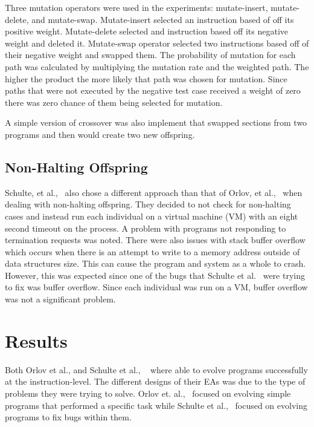 \documentclass{sig-alternate}
\begin{document}
Three mutation operators were used in the experiments: mutate-insert, mutate-delete, and mutate-swap. Mutate-insert selected an instruction based of off its positive weight. Mutate-delete selected and instruction based off its negative weight and deleted it. Mutate-swap operator selected two instructions based off of their negative weight and swapped them. The probability of mutation for each path was calculated by multiplying the mutation rate and the weighted path. The higher the product the more likely that path was chosen for mutation. Since paths that were not executed by the negative test case received a weight of zero there was zero chance of them being selected for mutation.

A simple version of crossover was also implement that swapped sections from two programs and then would create two new offspring. 

\subsection{Non-Halting Offspring}

Schulte, et al.,~\cite{Assembly:2010} also chose a different approach than that of Orlov, et al.,~\cite{FINCH:2011} when dealing with non-halting offspring. They decided to not check for non-halting cases and instead run each individual on a virtual machine (VM) with an eight second timeout on the process. A problem with programs not responding to termination requests was noted. There were also issues with stack buffer overflow which occurs when there is an attempt to write to a memory address outside of data structures size. This can cause the program and system as a whole to crash. However, this was expected since one of the bugs that Schulte et al.~\cite{Assembly:2010} were trying to fix was buffer overflow. Since each individual was run on a VM, buffer overflow was not a significant problem.




\section{Results}
Both Orlov et al., and Schulte et al., ~\cite{FINCH:2011, Assembly:2010} where able to evolve programs successfully at the instruction-level. The different designs of their EAs was due to the type of problems they were trying to solve. Orlov et. al.,~\cite{FINCH:2011} focused on evolving simple programs that performed a specific task while Schulte et al.,~\cite{Assembly:2010} focused on evolving programs to fix bugs within them.
\end{document}

